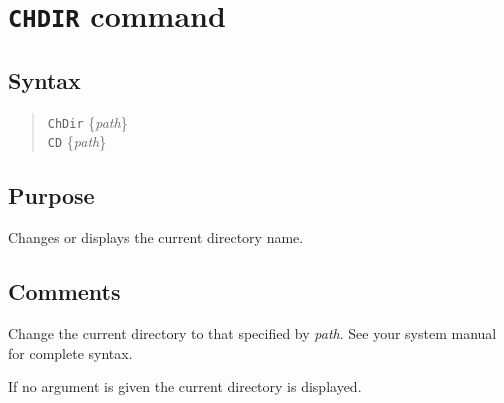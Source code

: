 %
%
%
%
\section{{\tt CHDIR} command}
\subsection{Syntax}
\begin{verse}
{\tt ChDir} \{{\it path}\}\\
{\tt CD} \{{\it path}\}
\end{verse}
\subsection{Purpose}

Changes or displays the current directory name.
\subsection{Comments}

Change the current directory to that specified by {\it path}.  See your
system manual for complete syntax.

If no argument is given the current directory is displayed.
